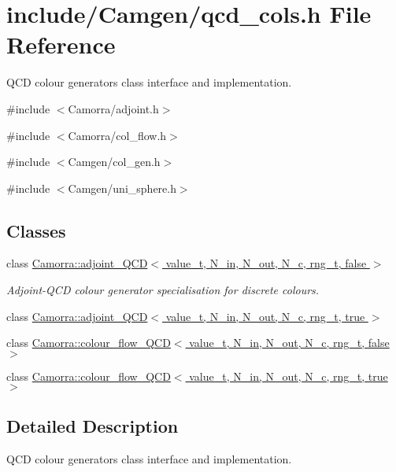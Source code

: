 \hypertarget{a00588}{
\section{include/Camgen/qcd\_\-cols.h File Reference}
\label{a00588}
}


QCD colour generators class interface and implementation.  


{\ttfamily \#include $<$Camorra/adjoint.h$>$}\par
{\ttfamily \#include $<$Camorra/col\_\-flow.h$>$}\par
{\ttfamily \#include $<$Camgen/col\_\-gen.h$>$}\par
{\ttfamily \#include $<$Camgen/uni\_\-sphere.h$>$}\par
\subsection*{Classes}
\begin{DoxyCompactItemize}
\item 
class \hyperlink{a00003}{Camorra::adjoint\_\-QCD$<$ value\_\-t, N\_\-in, N\_\-out, N\_\-c, rng\_\-t, false $>$}
\begin{DoxyCompactList}\small\item\em Adjoint-\/QCD colour generator specialisation for discrete colours. \end{DoxyCompactList}\item 
class \hyperlink{a00004}{Camorra::adjoint\_\-QCD$<$ value\_\-t, N\_\-in, N\_\-out, N\_\-c, rng\_\-t, true $>$}
\item 
class \hyperlink{a00073}{Camorra::colour\_\-flow\_\-QCD$<$ value\_\-t, N\_\-in, N\_\-out, N\_\-c, rng\_\-t, false $>$}
\item 
class \hyperlink{a00074}{Camorra::colour\_\-flow\_\-QCD$<$ value\_\-t, N\_\-in, N\_\-out, N\_\-c, rng\_\-t, true $>$}
\end{DoxyCompactItemize}


\subsection{Detailed Description}
QCD colour generators class interface and implementation. 